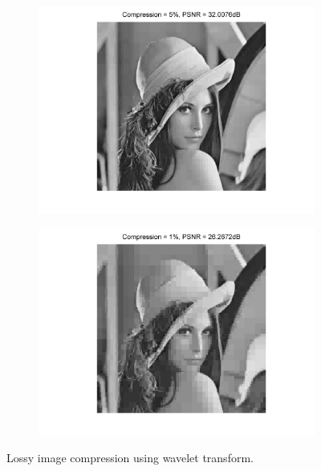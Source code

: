 \documentclass[11pt]{article}
\begin{document}
\begin{figure}[H]
	\begin{subfigure}{0.4\textwidth}
        \centering
		\includegraphics[trim=0.5in 0.3in 0.5in 0in, width=\textwidth]{Fig_Lena_Compr_05.png}
		\caption{}
		\label{Fig_Lena_Compr_05}
	\end{subfigure}
	\begin{subfigure}{0.4\textwidth}
        \centering
		\includegraphics[trim=0.5in 0.3in 0.5in 0in, width=\textwidth]{Fig_Lena_Compr_01.png}
		\caption{}
		\label{Fig_Lena_Compr_01}
	\end{subfigure}
	\caption{Lossy image compression using wavelet transform.}
	\label{Fig_Lena_Compr}
\end{figure}
\end{document}
